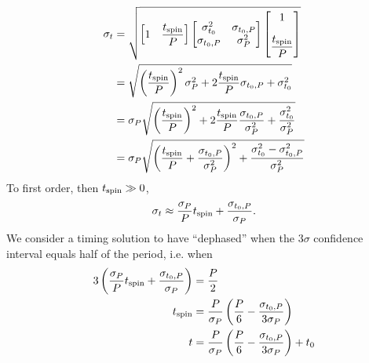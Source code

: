 \documentclass{book}
\begin{document}
\begin{equation}
  \begin{aligned}
    \sigma_t
      &= \sqrt{
         \begin{bmatrix}
           1 & \dfrac{t_{\rm spin}}{P}
         \end{bmatrix}
         \begin{bmatrix}
           \sigma_{t_0}^2 & \sigma_{t_0,P} \\
           \sigma_{t_0,P} & \sigma_{P}^2
         \end{bmatrix}
         \begin{bmatrix}
           1 \\[10pt] \dfrac{t_{\rm spin}}{P}
         \end{bmatrix}
         } \\
      &= \sqrt{
           \left(\dfrac{t_{\rm spin}}{P}\right)^2 \sigma_{P}^2 +
           2\dfrac{t_{\rm spin}}{P} \sigma_{t_0,P} + \sigma_{t_0}^2
         } \\
      &= \sigma_P \sqrt{
           \left(\dfrac{t_{\rm spin}}{P}\right)^2 +
           2\dfrac{t_{\rm spin}}{P} \dfrac{\sigma_{t_0,P}}{\sigma_P^2} + \dfrac{\sigma_{t_0}^2}{\sigma_P^2}
         } \\
      &= \sigma_P \sqrt{
           \left(\dfrac{t_{\rm spin}}{P} + \dfrac{\sigma_{t_0,P}}{\sigma_P^2}\right)^2  +
           \dfrac{\sigma_{t_0}^2 - \sigma_{t_0,P}^2}{\sigma_P^2}
         }
  \end{aligned}
\end{equation}
To first order, then $t_{\rm spin} \gg 0$,
\begin{equation}
  \sigma_t \approx \frac{\sigma_P}{P} t_{\rm spin} + \frac{\sigma_{t_0,P}}{\sigma_P}.
\end{equation}
We consider a timing solution to have ``dephased'' when the $3\sigma$ confidence interval equals half of the period, i.e. when
\begin{equation}
  \begin{aligned}
    3\left(\frac{\sigma_P}{P} t_{\rm spin} + \frac{\sigma_{t_0,P}}{\sigma_P}\right) &= \frac{P}{2} \\
    t_{\rm spin} &= \frac{P}{\sigma_P} \left(\frac{P}{6} - \frac{\sigma_{t_0,P}}{3\sigma_P}\right) \\
    t &= \frac{P}{\sigma_P} \left(\frac{P}{6} - \frac{\sigma_{t_0,P}}{3\sigma_P}\right) + t_0
  \end{aligned}
\end{equation}

\end{document}
